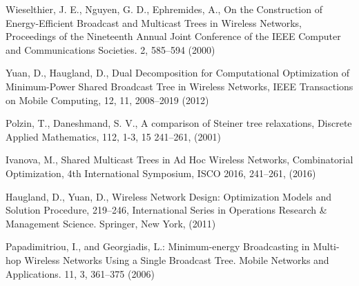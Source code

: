 \begin{thebibliography}{}
%
%
Wieselthier,  J. E., Nguyen, G. D., Ephremides, A.,
On the Construction of Energy-Efficient Broadcast and Multicast Trees in Wireless Networks,
Proceedings of the Nineteenth Annual Joint Conference of the IEEE Computer and Communications Societies.
2, 585--594 (2000)

Yuan, D., Haugland, D.,
Dual Decomposition for Computational Optimization of Minimum-Power Shared Broadcast Tree in Wireless Networks,
IEEE Transactions on Mobile Computing,
12, 11, 2008--2019 (2012)

Polzin, T., Daneshmand, S. V., A comparison of Steiner tree relaxations, Discrete Applied Mathematics, 112,  1-3, 15 241--261, (2001)

Ivanova, M., Shared Multicast Trees in Ad Hoc Wireless Networks, Combinatorial Optimization, 4th International Symposium, ISCO 2016, 241--261, (2016)

Haugland, D., Yuan, D.,
Wireless Network Design: Optimization Models and Solution Procedure, 219--246,
International Series in Operations Research \& Management Science.
Springer, New York, (2011)

Papadimitriou, I., and Georgiadis, L.:
Minimum-energy Broadcasting in Multi-hop Wireless Networks Using a Single Broadcast Tree.
Mobile Networks and Applications.
11, 3, 361--375 (2006)

\end{thebibliography}



